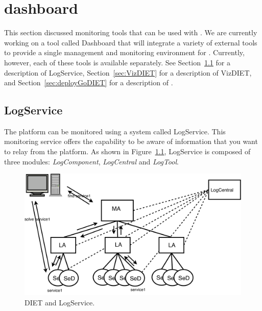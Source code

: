 
\chapter{\diet dashboard}
\label{ch:dashboard}

This section discussed monitoring tools that can be used with \diet.  We are
currently working on a tool called \diet Dashboard that will integrate a
variety of external tools to provide a single management and monitoring
environment for \diet. Currently, however, each of these tools is available
separately. See Section~\ref{sec:LogService} for a description of LogService,
Section~\ref{sec:VizDIET} for a description of VizDIET, and
Section~\ref{sec:deployGoDIET} for a description of \godiet.

\section{LogService}
\label{sec:LogService}

The \diet platform can be monitored using a system called LogService. 
This monitoring service offers the capability to be aware of information that
you want to relay from the platform.  As shown in
Figure~\ref{fig:DIET_LogService}, LogService is composed of three modules:
\textit{LogComponent}, \textit{LogCentral} and \textit{LogTool}.

 \begin{figure}[h!]
  \begin{center}
    \includegraphics[scale=0.6]{fig/DIET_arch_request-2}
    \caption{DIET and LogService.}
    \label{fig:DIET_LogService}
  \end{center}
\end{figure}

